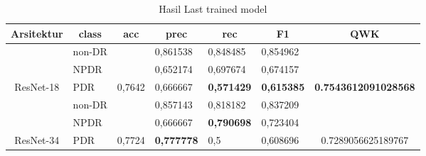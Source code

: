 \begin{table}[hbtp]
	\begin{center}
		\caption{Hasil Last trained model}
		\label{tb:HasilLastDefault}
		\begin{tabular}{|c|l|c|l|l|l|c|}
			\hline
			\rowcolor[HTML]{C0C0C0} 
			Arsitektur   & \multicolumn{1}{c|}{\cellcolor[HTML]{C0C0C0}class} & acc                      & \multicolumn{1}{c|}{\cellcolor[HTML]{C0C0C0}prec} & \multicolumn{1}{c|}{\cellcolor[HTML]{C0C0C0}rec} & \multicolumn{1}{c|}{\cellcolor[HTML]{C0C0C0}F1} & QWK                                  \\ \hline
			& non-DR                                             &                          & 0,861538                                          & 0,848485                                         & 0,854962                                        &                                      \\ \cline{2-2} \cline{4-6}
			& NPDR                                               &                          & 0,652174                                          & 0,697674                                         & 0,674157                                        &                                      \\ \cline{2-2} \cline{4-6}
			\multirow{-3}{*}{ResNet-18}  & PDR                                                & \multirow{-3}{*}{0,7642} & 0,666667                                          & \textbf{0,571429}                                         & \textbf{0,615385}                                        & \multirow{-3}{*}{\textbf{0.7543612091028568}} \\ \hline
			& non-DR                                             &                          & 0,857143                                          & 0,818182                                         & 0,837209                                        &                                      \\ \cline{2-2} \cline{4-6}
			& NPDR                                               &                          & 0,666667                                          & \textbf{0,790698}                                         & 0,723404                                        &                                      \\ \cline{2-2} \cline{4-6}
			\multirow{-3}{*}{ResNet-34}  & PDR                                                & \multirow{-3}{*}{0,7724} & \textbf{0,777778}                                          & 0,5                                              & 0,608696                                        & \multirow{-3}{*}{0.7289056625189767} \\ \hline

\end{tabular}
\end{center}
\end{table}
